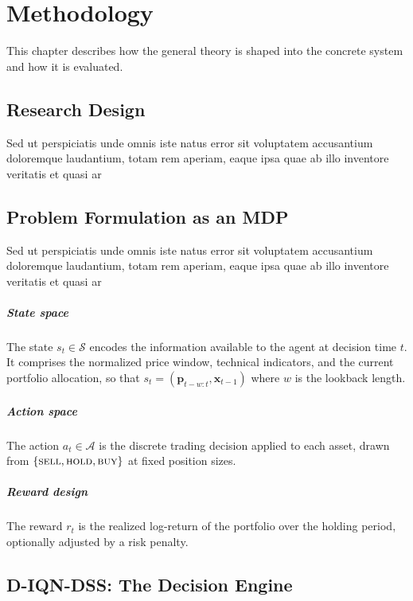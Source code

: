 \chapter{Methodology}

This chapter describes how the general theory is shaped into the concrete
system and how it is evaluated.

\section{Research Design}

Sed ut perspiciatis unde omnis iste natus error sit voluptatem accusantium doloremque laudantium, totam rem aperiam, eaque ipsa quae ab illo inventore veritatis et quasi ar

\section{Problem Formulation as an MDP}

Sed ut perspiciatis unde omnis iste natus error sit voluptatem accusantium doloremque laudantium, totam rem aperiam, eaque ipsa quae ab illo inventore veritatis et quasi ar

\paragraph{State space} The state $s_t \in \mathcal{S}$ encodes the information
available to the agent at decision time $t$. It comprises the normalized price
window, technical indicators, and the current portfolio allocation, so that
$s_t = (\mathbf{p}_{t-w:t}, \mathbf{x}_{t-1})$ where $w$ is the lookback length.

\paragraph{Action space} The action $a_t \in \mathcal{A}$ is the discrete trading
decision applied to each asset, drawn from $\{\textsc{sell}, \textsc{hold},
\textsc{buy}\}$ at fixed position sizes.

\paragraph{Reward design} 
The reward $r_t$ is the realized log-return of the
portfolio over the holding period, optionally adjusted by a risk penalty.
\section{D-IQN-DSS: The Decision Engine}

